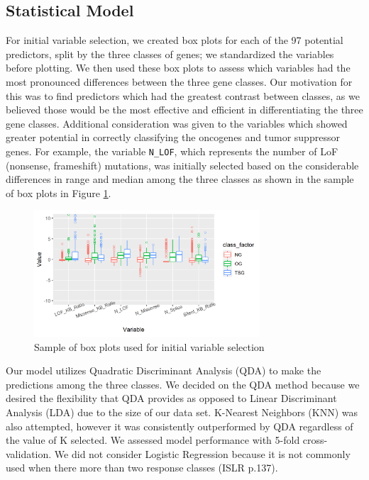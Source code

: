 \documentclass{scrartcl}
\begin{document}
\subsection{Statistical Model}

For initial variable selection, we created box plots for each of the 97 potential predictors, split by the three classes of genes; we standardized the variables before plotting. We then used these box plots to assess which variables had the most pronounced differences between the three gene classes. Our motivation for this was to find predictors which had the greatest contrast between classes, as we believed those would be the most effective and efficient in differentiating the three gene classes. Additional consideration was given to the variables which showed greater potential in correctly classifying the oncogenes and tumor suppressor genes. For example, the variable \verb|N_LOF|, which represents the number of LoF (nonsense, frameshift) mutations, was initially selected based on the considerable differences in range and median among the three classes as shown in the sample of box plots in Figure \ref{fig:boxplots}.

\begin{figure}
    \centering
    \includegraphics[width=0.75\textwidth]{boxplots.png}
    \caption{Sample of box plots used for initial variable selection}
    \label{fig:boxplots}
\end{figure}

Our model utilizes Quadratic Discriminant Analysis (QDA) to make the predictions among the three classes. We decided on the QDA method because we desired the flexibility that QDA provides as opposed to Linear Discriminant Analysis (LDA) due to the size of our data set. K-Nearest Neighbors (KNN) was also attempted, however it was consistently outperformed by QDA regardless of the value of K selected. We assessed model performance with 5-fold cross-validation. We did not consider Logistic Regression because it is not commonly used when there more than two response classes (ISLR p.137).
\end{document}
